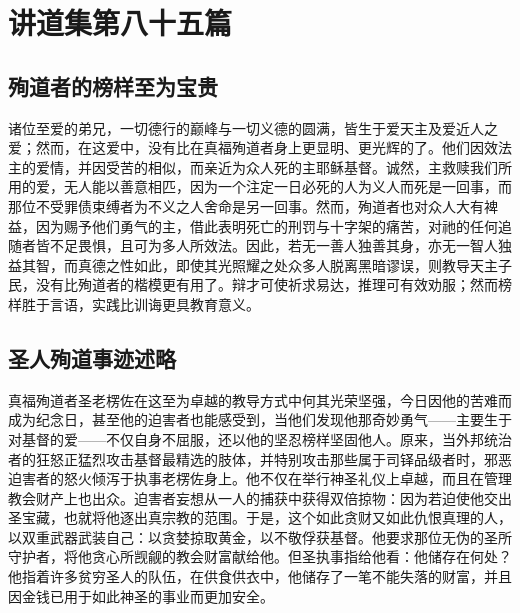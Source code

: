 

\section{讲道集第八十五篇}

\par


\subsection{殉道者的榜样至为宝贵}

诸位至爱的弟兄，一切德行的巅峰与一切义德的圆满，皆生于爱天主及爱近人之爱；然而，在这爱中，没有比在真福殉道者身上更显明、更光辉的了。他们因效法主的爱情，并因受苦的相似，而亲近为众人死的主耶稣基督。诚然，主救赎我们所用的爱，无人能以善意相匹，因为一个注定一日必死的人为义人而死是一回事，而那位不受罪债束缚者为不义之人舍命是另一回事。然而，殉道者也对众人大有裨益，因为赐予他们勇气的主，借此表明死亡的刑罚与十字架的痛苦，对祂的任何追随者皆不足畏惧，且可为多人所效法。因此，若无一善人独善其身，亦无一智人独益其智，而真德之性如此，即使其光照耀之处众多人脱离黑暗谬误，则教导天主子民，没有比殉道者的楷模更有用了。辩才可使祈求易达，推理可有效劝服；然而榜样胜于言语，实践比训诲更具教育意义。\par


\subsection{圣人殉道事迹述略}

真福殉道者圣老楞佐在这至为卓越的教导方式中何其光荣坚强，今日因他的苦难而成为纪念日，甚至他的迫害者也能感受到，当他们发现他那奇妙勇气——主要生于对基督的爱——不仅自身不屈服，还以他的坚忍榜样坚固他人。原来，当外邦统治者的狂怒正猛烈攻击基督最精选的肢体，并特别攻击那些属于司铎品级者时，邪恶迫害者的怒火倾泻于执事老楞佐身上。他不仅在举行神圣礼仪上卓越，而且在管理教会财产上也出众。迫害者妄想从一人的捕获中获得双倍掠物：因为若迫使他交出圣宝藏，也就将他逐出真宗教的范围。于是，这个如此贪财又如此仇恨真理的人，以双重武器武装自己：以贪婪掠取黄金，以不敬俘获基督。他要求那位无伪的圣所守护者，将他贪心所觊觎的教会财富献给他。但圣执事指给他看：他储存在何处？他指着许多贫穷圣人的队伍，在供食供衣中，他储存了一笔不能失落的财富，并且因金钱已用于如此神圣的事业而更加安全。\par

